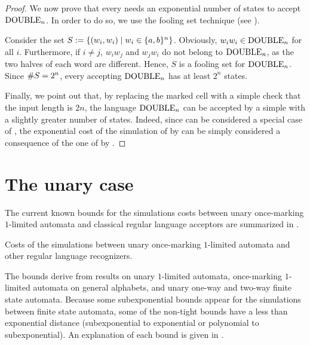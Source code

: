 \begin{proof}
	We now prove that every \ONFA needs an exponential number of states to accept $\mathrm{DOUBLE}_n$.
	In order to do so, we use the fooling set technique (see ).

	Consider the set $S:=\{(w_i,w_i)\mid w_i\in\{a,b\}^n\}$.
	Obviously, $w_iw_i\in\mathrm{DOUBLE}_n$ for all $i$.
	Furthermore, if $i\ne j$, $w_iw_j$ and $w_jw_i$ do not belong to $\mathrm{DOUBLE}_n$, as the two halves of each word are different.
	Hence, $S$ is a fooling set for $\mathrm{DOUBLE}_n$.
	Since $\# S=2^n$, every \ONFA accepting $\mathrm{DOUBLE}_n$ has at least $2^n$ states.

	Finally, we point out that, by replacing the marked cell with a simple check that the input length is $2n$, the language $\mathrm{DOUBLE}_n$ can be accepted by a simple \TDFA with a slightly greater number of states.
	Indeed, since \TDFA can be considered a special case of \OMODLA, the exponential cost of the simulation of \OMODLA by \ONFA can be simply considered a consequence of the one of \TDFA by \ONFA.
\end{proof}



\section{The unary case}\label{sec:oncemarking-unary}
The current known bounds for the simulations costs between unary once-marking $1$-limited automata and classical regular language acceptors are summarized in .

\begin{table}
	\caption{Costs of the simulations between unary once-marking $1$-limited automata and other regular language recognizers.}
	\label{tab:sims-om-unary-oncemarking}
\end{table}

The bounds derive from results on unary $1$-limited automata, once-marking $1$-limited automata on general alphabets, and unary one-way and two-way finite state automata.
Because some subexponential bounds appear for the simulations between finite state automata, some of the non-tight bounds have a less than exponential distance (subexponential to exponential or polynomial to subexponential).
An explanation of each bound is given in .

